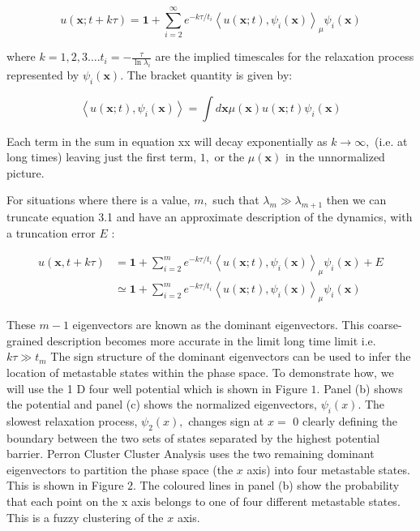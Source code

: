 \begin{equation}
u(\mathbf{x} ; t+k \tau)=\mathbf{1}+\sum_{i=2}^{\infty} e^{-k \tau / t_{i}}\left\langle u(\mathbf{x} ; t), \psi_{i}(\mathbf{x})\right\rangle_{\mu} \psi_{i}(\mathbf{x})
\end{equation}

where $k=1,2,3 \ldots . t_{i}=-\frac{\tau}{\ln \lambda_{i}}$ are the implied timescales for the relaxation process represented by $\psi_{i}(\mathbf{x}) .$ The bracket quantity is given by:

\begin{equation}
\left\langle u(\mathbf{x} ; t), \psi_{i}(\mathbf{x})\right\rangle=\int d \mathbf{x} \mu(\mathbf{x}) u(\mathbf{x} ; t) \psi_{i}(\mathbf{x})
\end{equation}

Each term in the sum in equation xx will decay exponentially as $k \rightarrow \infty,$ (i.e. at long times) leaving just the first term, $1,$ or the $\mu(\mathbf{x})$ in the unnormalized picture.

For situations where there is a value, $m,$ such that $\lambda_{m} \gg \lambda_{m+1}$ then we can truncate equation 3.1 and have an approximate description of the dynamics, with a truncation error $E$ :

\begin{equation}
\begin{split}
u(\mathbf{x},  t+k \tau) &=\mathbf{1}+\sum_{i=2}^{m} e^{-k \tau / t_{i}}\left\langle u(\mathbf{x} ; t), \psi_{i}(\mathbf{x})\right\rangle_{\mu} \psi_{i}(\mathbf{x})+E \\
& \simeq \mathbf{1}+\sum_{i=2}^{m} e^{-k \tau / t_{i}}\left\langle u(\mathbf{x} ; t), \psi_{i}(\mathbf{x})\right\rangle_{\mu} \psi_{i}(\mathbf{x})
\end{split}
\end{equation}


These $m-1$ eigenvectors are known as the dominant eigenvectors. This coarse-grained description becomes more accurate in the limit long time limit i.e. $k \tau \gg t_{m}$
The sign structure of the dominant eigenvectors can be used to infer the location of metastable states within the phase space. To demonstrate how, we will use the 1 D four well potential which is shown in Figure $1 .$ Panel (b) shows the potential and panel (c) shows the normalized eigenvectors, $\psi_{i}(x) .$ The slowest relaxation process, $\psi_{2}(x),$ changes sign at $x=$ 0 clearly defining the boundary between the two sets of states separated by the highest potential barrier. Perron Cluster Cluster Analysis uses the two remaining dominant eigenvectors to partition the phase space (the $x$ axis) into four metastable states. This is shown in Figure $2 .$ The coloured lines in panel (b) show the probability that each point on the x axis belongs to one of four different metastable states. This is a fuzzy clustering of the $x$ axis.

